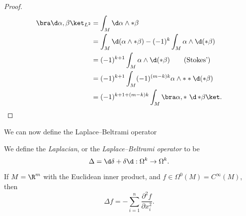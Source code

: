 \documentclass[a4paper]{article}
\begin{document}
\begin{proof}
  \begin{align*}
    \bra \d \alpha, \beta \ket_{L^2} &= \int_M \d \alpha \wedge * \beta\\
    &= \int_M \d (\alpha \wedge *\beta) - (-1)^k \int_M \alpha \wedge \d (*\beta)\\
    &= (-1)^{k + 1} \int_M \alpha \wedge \d (*\beta)\tag{Stokes'}\\
    &= (-1)^{k + 1} \int_M (-1)^{(m - k)k} \alpha \wedge **\d (*\beta)\\
    &= (-1)^{k + 1 + (m - k)k} \int_M \bra \alpha, {*\ \d\,*}\beta\ket.\qedhere
  \end{align*}
\end{proof}

We can now define the Laplace--Beltrami operator
\begin{defi}
  We define the \emph{Laplacian}, or the \emph{Laplace--Beltrami operator} to be
  \[
    \Delta = \d \delta + \delta \d: \Omega^k \to \Omega^k.
  \]
\end{defi}

\begin{eg}
  If $M = \R^m$ with the Euclidean inner product, and $f \in \Omega^0(M) = C^\infty(M)$, then
  \[
    \Delta f = - \sum_{i = 1}^n \frac{\partial^2 f}{\partial x_i^2}.
  \]
\end{eg}
\end{document}
